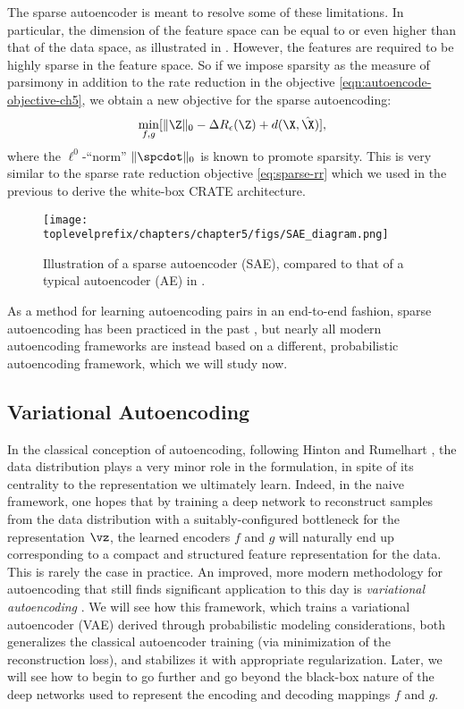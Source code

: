 \documentclass[../../book-main.tex]{subfiles}
\begin{document}
The sparse autoencoder is meant to resolve some of these limitations. In
particular, the dimension of the feature space can be equal to or
even higher than that of the data space, as illustrated in 
. However, the features are required to be highly
sparse in the feature space. So if we impose sparsity as the measure
of parsimony in addition to the rate reduction in the objective
\eqref{eqn:autoencode-objective-ch5}, we obtain a new objective for
the sparse autoencoding:
\begin{equation}
  \min_{f, g}
  [\|\Z\|_0 - \Delta R_{\epsilon}(\Z) + d(\X, \hat \X)],
  \label{eqn:autoencode-sparse}
\end{equation}
where the $\ell^0$-``norm'' $\|\spcdot\|_0$ is known to promote sparsity.
This is very similar to the sparse rate reduction objective
\eqref{eq:sparse-rr} which we used in the previous  to derive the white-box CRATE architecture.

\begin{figure}
  \centering
  \texttt{[image: \\toplevelprefix/chapters/chapter5/figs/SAE\_diagram.png]}
  \caption{Illustration of a sparse autoencoder (SAE), compared to
  that of a typical autoencoder (AE) in . }
  \label{fig:SAE}
\end{figure}


As a method for learning autoencoding pairs in an end-to-end fashion, sparse
autoencoding has been practiced in the past
\cite{Ranzato2006-oq,10.5555/3042573.3042641}, but nearly all modern
autoencoding frameworks are instead based on a different, probabilistic
autoencoding framework, which we will study now.

\subsection{Variational Autoencoding}\label{sec:vae}

In the classical conception of autoencoding, following Hinton and Rumelhart
\cite{Rumelhart1986}, the data distribution plays a very minor role in the
formulation, in spite of its centrality to the representation we ultimately
learn. Indeed, in the naive framework, one hopes that by training a deep network
to reconstruct samples from the data distribution with a suitably-configured
bottleneck for the representation $\vz$, the learned encoders $f$ and $g$ will
naturally end up corresponding to a compact and structured feature
representation for the data. This is rarely the case in practice.
An improved, more modern methodology for autoencoding that still finds
significant application to this day is \textit{variational autoencoding}
\cite{Kingma2013-sb,Kingma2019-zh}.
We will see how this framework, which trains a variational autoencoder (VAE)
derived through probabilistic modeling considerations, both generalizes the
classical autoencoder training (via minimization of the reconstruction loss),
and stabilizes it with appropriate regularization. Later, we will see how to
begin to go further and go beyond the black-box nature of the deep networks used
to represent the encoding and decoding mappings $f$ and $g$.
\end{document}
